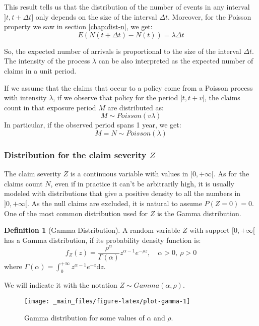 \documentclass[a4paper, nobind]{templates/ociamthesis}
\theoremstyle{definition}
\newtheorem{definition}{Definition}[chapter]
\theoremstyle{definition}
\theoremstyle{definition}
\theoremstyle{remark}
\begin{document}
This result tells us that the distribution of the number of events in any interval \(]t, t+\Delta t]\) only depends on the size of the interval \(\Delta t\). Moreover, for the Poisson property we saw in section \ref{chap:dist-n}, we get:
\[E(N(t + \Delta t) - N(t)) = \lambda \Delta t\]

So, the expected number of arrivals is proportional to the size of the interval \(\Delta t\). The intensity of the process \(\lambda\) can be also interpreted as the expected number of claims in a unit period.

If we assume that the claims that occur to a policy come from a Poisson process with intensity \(\lambda\), if we observe that policy for the period \(]t, t+v]\), the claims count in that exposure period \(M\) are distributed as:
\[ M\sim Poisson(v \lambda) \]
In particular, if the observed period spans 1 year, we get:
\[ M = N \sim Poisson(\lambda) \]

\hypertarget{distribution-for-the-claim-severity-z}{%
\subsubsection{\texorpdfstring{Distribution for the claim severity \(Z\)}{Distribution for the claim severity Z}}\label{distribution-for-the-claim-severity-z}}

The claim severity \(Z\) is a continuous variable with values in \([0, +\infty[\). As for the claims count \(N\), even if in practice it can't be arbitrarily high, it is usually modeled with distributions that give a positive density to all the numbers in \(]0, +\infty[\). As the null claims are excluded, it is natural to assume \(P\left( Z=0 \right) = 0\). One of the most common distribution used for \(Z\) is the Gamma distribution.

\begin{definition}[Gamma Distribution]
\label{def:def-gamma} \iffalse (Gamma Distribution) \fi{} A random variable \(Z\) with support \([0, +\infty[\) has a Gamma distribution, if its probability density function is:
\[
f_Z(z) = \frac{\rho^\alpha}{\Gamma(\alpha)}z^{\alpha-1}e^{-\rho z}, \quad \alpha > 0, \ \rho > 0
\]
where \(\Gamma(\alpha) = \int_{0}^{+\infty}{z^{\alpha - 1} e^{-z} \mathrm{d} z}\).

We will indicate it with the notation \(Z \sim Gamma(\alpha, \rho)\).
\end{definition}

\begin{figure}[!hbtp]

{\centering \texttt{[image: \_main\_files/figure-latex/plot-gamma-1]} 

}

\caption{Gamma distribution for some values of $\alpha$ and $\rho$.}\label{fig:plot-gamma}
\end{figure}
\end{document}
